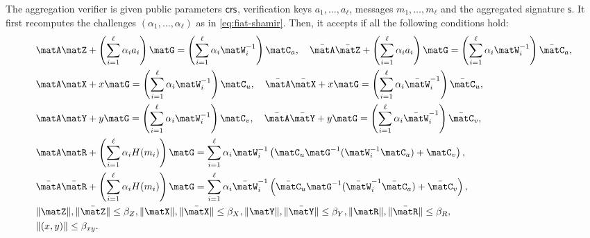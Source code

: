 \documentclass[11pt,letterpaper]{article}
\theoremstyle{definition} %
\newcommand{\doclearpage}{%
	\iffull
	\clearpage
	\fi
}
\begin{document}
The aggregation verifier is given  public parameters $\mathsf{crs}$, verification keys $a_1,\ldots,a_\ell$, messages $m_1,\ldots,m_\ell$ and the aggregated signature $\mathsf{s}$. It first recomputes the challenges $(\alpha_1,\ldots,\alpha_\ell)$ as in \eqref{eq:fiat-shamir}. Then, it accepts if all the following conditions hold:
\begin{align*} & \matA\matZ + \left(\sum^\ell_{i=1} \alpha_i a_i\right) \matG = \left(\sum^{\ell}_{i=1} \alpha_i\matW^{-1}_i\right) \matC_a, \quad \bar{\matA}\bar{\matZ} + \left(\sum^\ell_{i=1} \alpha_i a_i\right) \matG = \left(\sum^{\ell}_{i=1} \alpha_i\matW^{-1}_i\right) \bar{\matC}_a, \\
& \matA\matX + x \matG = \left(\sum^{\ell}_{i=1} \alpha_i\matW^{-1}_i\right) \matC_u, \quad \bar{\matA}\bar{\matX} + x \matG = \left(\sum^{\ell}_{i=1} \alpha_i\bar{\matW}^{-1}_i\right) \bar{\matC}_u, \\
&  \matA\matY + y \matG = \left(\sum^{\ell}_{i=1} \alpha_i\matW^{-1}_i\right) \matC_v,  \quad \bar{\matA}\bar{\matY} + y \matG = \left(\sum^{\ell}_{i=1} \alpha_i\bar{\matW}^{-1}_i\right) \bar{\matC}_v, \\
& \matA \matR +  \left(\sum^\ell_{i=1} \alpha_i H(m_i) \right) \matG = \sum^\ell_{i=1}\alpha_i\matW_i^{-1}\left(\matC_u\matG^{-1}(\matW_i^{-1}\matC_a) + \matC_v\right), \\
& \bar{\matA} \bar{\matR} +  \left(\sum^\ell_{i=1} \alpha_i H(m_i) \right) \matG = \sum^\ell_{i=1}\alpha_i\bar{\matW}_i^{-1}\left(\bar{\matC}_u\matG^{-1}(\bar{\matW}_i^{-1}\bar{\matC}_a) + \bar{\matC}_v\right), \\
& \|\matZ\|, \| \bar{\matZ}\| \leq \beta_Z, \|\matX\|,\| \bar{\matX}\| \leq \beta_X, \|\matY\|,\| \bar{\matY}\| \leq \beta_Y, \|\matR\|,\| \bar{\matR}\| \leq \beta_R, \\
& \|(x,y)\| \leq \beta_{xy}.
\end{align*}

\doclearpage


\appendix
\end{document}
